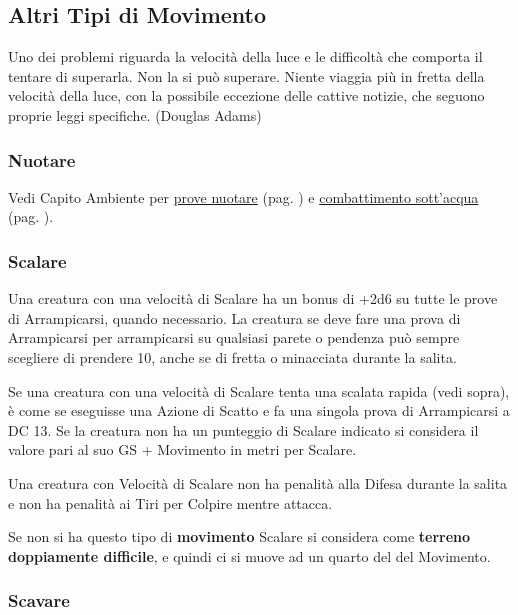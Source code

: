 \begin{multicols}{2}
\subsection{Altri Tipi di Movimento}

\begin{enfasi}{
Uno dei problemi riguarda la velocità della luce e le difficoltà che comporta il tentare di superarla. Non la si può superare. Niente viaggia più in fretta della velocità della luce, con la possibile eccezione delle cattive notizie, che seguono proprie leggi specifiche. (Douglas Adams)
}\end{enfasi}

\label{altri-tipi-di-movimento}

\subsubsection{Nuotare}\label{nuotare}

Vedi Capito Ambiente per \hyperlink{pericoli-dellacqua}{prove nuotare} (pag. \pageref{pericoli-dellacqua}) e \hyperlink{combatteresottacqua}{combattimento sott'acqua} (pag. \pageref{combatteresottacqua}).

\subsubsection{Scalare}\label{scalare}

Una creatura con una velocità di Scalare ha un bonus di +2d6 su tutte le prove di Arrampicarsi, quando necessario. La creatura se deve fare una prova di Arrampicarsi per arrampicarsi su qualsiasi parete o pendenza può sempre scegliere di prendere 10, anche se di fretta o minacciata durante la salita.

Se una creatura con una velocità di Scalare tenta una scalata rapida (vedi sopra), è come se eseguisse una Azione di Scatto e fa una singola prova di Arrampicarsi a DC 13. Se la creatura non ha un punteggio di Scalare indicato si considera il valore pari al suo GS + Movimento in metri per Scalare.

Una creatura con Velocità di Scalare non ha penalità alla Difesa durante la salita e non ha penalità ai Tiri per Colpire mentre attacca.

Se non si ha questo tipo di \textbf{movimento} Scalare si considera come \textbf{terreno doppiamente difficile}, e quindi ci si muove ad un quarto del del Movimento.

\subsubsection{Scavare}\label{scavare}


\end{multicols}
